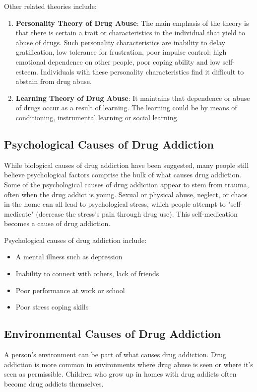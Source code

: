 \documentclass{report}
\begin{document}
Other related theories include: 
\begin{enumerate}
    \item \textbf{Personality Theory of Drug Abuse}: The main emphasis of the theory is that there is certain a trait or characteristics in the individual that yield to abuse of drugs. Such personality characteristics are inability to delay gratification, low tolerance for frustration, poor impulse control; high emotional dependence on other people, poor coping ability and low self-esteem. Individuals with these personality characteristics find it difficult to abstain from drug abuse. 
    
    \item \textbf{Learning Theory of Drug Abuse}: It maintains that dependence or abuse of drugs occur as a result of learning. The learning could be by means of conditioning, instrumental learning or social learning.
\end{enumerate}

\subsection{Psychological Causes of Drug Addiction}
While biological causes of drug addiction have been suggested, many people still believe psychological factors comprise the bulk of what causes drug addiction. Some of the psychological causes of drug addiction appear to stem from trauma, often when the drug addict is young. Sexual or physical abuse, neglect, or chaos in the home can all lead to psychological stress, which people attempt to "self-medicate" (decrease the stress's pain through drug use). This self-medication becomes a cause of drug addiction.

Psychological causes of drug addiction include:
\begin{itemize}
    \item 
    A mental illness such as depression
    
    \item
    Inability to connect with others, lack of friends
    
    \item
    Poor performance at work or school

    \item
    Poor stress coping skills
\end{itemize}


\subsection{Environmental Causes of Drug Addiction}
A person's environment can be part of what causes drug addiction. Drug addiction is more common in environments where drug abuse is seen or where it's seen as permissible. Children who grow up in homes with drug addicts often become drug addicts themselves.
\end{document}
